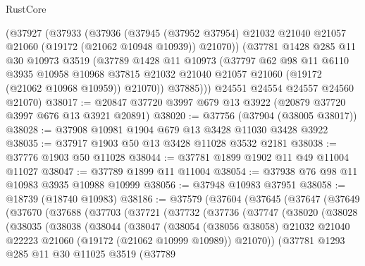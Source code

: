\begin{lexlean}{RustCore}
\begin{coremodule}
      (@37927
        (@37933
          (@37936
            (@37945
              (@37952 @37954)
              @21032
              @21040
              @21057
              @21060
              (@19172 (@21062 @10948 @10939))
              @21070))
          (@37781
            @1428
            @285
            @11
            @30
            @10973
            @3519
            (@37789
              @1428
              @11
              @10973
              (@37797
                @62
                @98
                @11
                @6110
                @3935
                @10958
                @10968
                @37815
                @21032
                @21040
                @21057
                @21060
                (@19172 (@21062 @10968 @10959))
                @21070))
            @37885)))
      @24551
      @24554
      @24557
      @24560
      @21070)
@38017 := @20847 @37720 @3997 @679 @13 @3922 (@20879 @37720 @3997 @676 @13 @3921 @20891)
@38020 := @37756 (@37904 (@38005 @38017))
@38028 := @37908 @10981 @1904 @679 @13 @3428 @11030 @3428 @3922
@38035 := @37917 @1903 @50 @13 @3428 @11028 @3532 @2181
@38038 := @37776 @1903 @50 @11028
@38044 := @37781 @1899 @1902 @11 @49 @11004 @11027
@38047 := @37789 @1899 @11 @11004
@38054 := @37938 @76 @98 @11 @10983 @3935 @10988 @10999
@38056 := @37948 @10983 @37951
@38058 := @18739 (@18740 @10983)
@38186 := @37579
    (@37604
      (@37645
        (@37647
          (@37649
            (@37670
              (@37688
                (@37703
                  (@37721
                    (@37732
                      (@37736
                        (@37747
                          (@38020
                            (@38028
                              (@38035
                                (@38038
                                  (@38044
                                    (@38047
                                      (@38054
                                        (@38056 @38058)
                                        @21032
                                        @21040
                                        @22223
                                        @21060
                                        (@19172 (@21062 @10999 @10989))
                                        @21070))
                                    (@37781
                                      @1293
                                      @285
                                      @11
                                      @30
                                      @11025
                                      @3519
                                      (@37789

\end{coremodule}
\end{lexlean}
